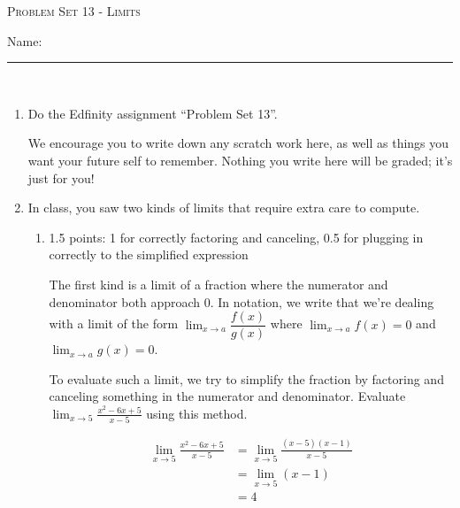 \documentclass{article}
\newcommand{\doedfinity}[2][\newpage]{
  \begin{problem}[#1]
    Do the Edfinity assignment ``Problem Set #2''.

    We encourage you to write down any scratch work here, as well as
    things you want your future self to remember. Nothing you write
    here will be graded; it's just for you!
  \end{problem}
}
\begin{document}
\begin{center}
  \large\textsc{Problem Set 13 - Limits}\vspace{.5in}\\
  \begin{problemonly}
   \large Name: \rule{5cm}{0.15mm}\\
   \end{problemonly}
\end{center}

\begin{enumerate}
\item  {}

  \doedfinity{13}

\item \label{something-over-0-limits}

  In class, you saw two kinds of limits that require extra care to compute. 

  \begin{enumerate}
  \item

    \begin{grading}
      1.5 points: 1 for correctly factoring and canceling, 0.5 for plugging in correctly to the simplified expression 
    \end{grading}

    \begin{problem}[\stretch{5}]
      The first kind is a limit of a fraction where the numerator and denominator both approach 0. In notation, we write that we're dealing with a limit of the form $\displaystyle \lim_{x \to a} \dfrac{f(x)}{g(x)}$ where $\displaystyle \lim_{x \to a} f(x) = 0$ and $\displaystyle \lim_{x \to a} g(x) = 0$.

      To evaluate such a limit, we try to simplify the fraction by factoring and canceling something in the numerator and denominator. Evaluate $\displaystyle \lim_{x \to 5} \frac{x^2 - 6x + 5}{x - 5}$ using this method. 
    \end{problem}

    \begin{solution}
      \begin{align*}
        \lim_{x \to 5} \frac{x^2 - 6x +5}{x-5} &= \lim_{x \to 5} \frac{(x-5)(x-1)}{x-5} \\
        &= \lim_{x \to 5} (x-1) \\
        &= 4
      \end{align*}
    \end{solution}


\end{enumerate}
\end{enumerate}
\end{document}
